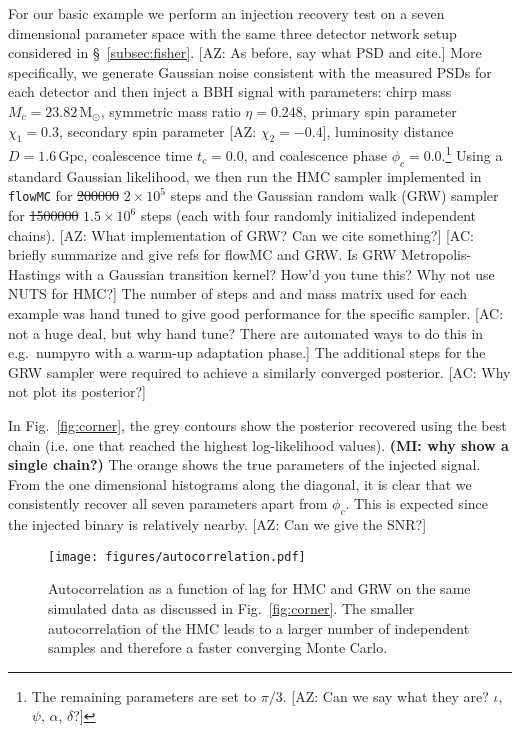 \documentclass[twocolumn]{aastex631}
\newcommand{\flowMC}{\texttt{flowMC}\xspace}
\newcommand{\AZ}[1]{{\color{Burnt}[AZ: #1]}}
\newcommand{\mi}[1]{\textbf{\color{teal}(MI: #1)}}
\newcommand{\amc}[1]{{\color{red}[AC: #1]}}
\begin{document}
For our basic example we perform an injection recovery test on a seven dimensional parameter space with the same three detector network setup considered in \S~\ref{subsec:fisher}.
\AZ{As before, say what PSD and cite.}
More specifically, we generate Gaussian noise consistent with the measured PSDs for each detector and then inject a BBH signal with parameters: chirp mass $M_c = 23.82\,\mathrm{M_\odot}$,  symmetric mass ratio $\eta = 0.248$, primary spin parameter $\chi_1=0.3$, secondary spin parameter \AZ{$\chi_2=-0.4$}, luminosity distance $D = 1.6\,\mathrm{Gpc}$, coalescence time $t_c = 0.0$, and coalescence phase $\phi_c = 0.0$.\footnote{
    The remaining parameters are set to $\pi/3$. \AZ{Can we say what they are? $\iota$, $\psi$, $\alpha$, $\delta$?}
}
Using a standard Gaussian likelihood, we then run the HMC sampler implemented in \flowMC for \sout{200000} $2\times10^5$ steps and the Gaussian random walk (GRW) sampler for \sout{1500000} $1.5\times10^6$ steps (each with four randomly initialized independent chains). 
\AZ{What implementation of GRW? Can we cite something?}
\amc{briefly summarize and give refs for flowMC and GRW. Is GRW Metropolis-Hastings with a Gaussian transition kernel? How'd you tune this? Why not use NUTS for HMC?}
The number of steps and and mass matrix used for each example was hand tuned to give good performance for the specific sampler.
\amc{not a huge deal, but why hand tune? There are automated ways to do this in e.g.\ numpyro with a warm-up adaptation phase.}
The additional steps for the GRW sampler were required to achieve a similarly converged posterior.
\amc{Why not plot its posterior?}

In Fig.~\ref{fig:corner}, the grey contours show the posterior recovered using the best chain (i.e. one that reached the highest log-likelihood values).
\mi{why show a single chain?}
The orange shows the true parameters of the injected signal.
From the one dimensional histograms along the diagonal, it is clear that we consistently recover all seven parameters apart from $\phi_c$.
This is expected since the injected binary is relatively nearby.
\AZ{Can we give the SNR?}

\begin{figure}[t]
	\begin{centering}
		\texttt{[image: figures/autocorrelation.pdf]}
		\caption{
			Autocorrelation as a function of lag for HMC and GRW on the same simulated data as discussed in Fig.~\ref{fig:corner}.
            The smaller autocorrelation of the HMC leads to a larger number of independent samples and therefore a faster converging Monte Carlo.
		}
		\label{fig:autocorrelation}
	\end{centering}
\end{figure}
\end{document}
